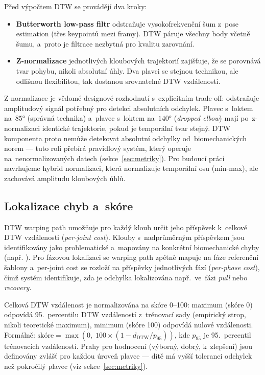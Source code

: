 Před výpočtem DTW se provádějí dva kroky:
\begin{itemize}
    \item \textbf{Butterworth low-pass filtr} odstraňuje vysokofrekvenční šum z~pose estimation (třes keypointů mezi framy). DTW páruje všechny body včetně šumu, a~proto je filtrace nezbytná pro kvalitu zarovnání.
    \item \textbf{Z-normalizace} jednotlivých kloubových trajektorií zajišťuje, že se porovnává tvar pohybu, nikoli absolutní úhly. Dva plavci se stejnou technikou, ale odlišnou flexibilitou, tak dostanou srovnatelné DTW vzdálenosti.
\end{itemize}

Z-normalizace je vědomé designové rozhodnutí s~explicitním trade-off: odstraňuje amplitudový signál potřebný pro detekci absolutních odchylek. Plavec s~loktem na~$85°$ (správná technika) a~plavec s~loktem na~$140°$ (\textit{dropped elbow}) mají po~z-normalizaci identické trajektorie, pokud je temporální tvar stejný. DTW komponenta proto nemůže detekovat absolutní odchylky od~biomechanických norem --- tuto roli přebírá pravidlový systém, který operuje na~nenormalizovaných datech (sekce~\ref{sec:metriky}). Pro budoucí práci navrhujeme hybrid normalizaci, která normalizuje temporální osu (min-max), ale zachovává amplitudu kloubových úhlů.

\subsection{Lokalizace chyb a~skóre}

DTW warping path umožňuje pro každý kloub určit jeho příspěvek k~celkové DTW vzdálenosti (\textit{per-joint cost}). Klouby s~nadprůměrným příspěvkem jsou identifikovány jako problematické a~mapovány na konkrétní biomechanické chyby (např. ). Pro fázovou lokalizaci se warping path zpětně mapuje na fáze referenční šablony a~per-joint cost se rozloží na příspěvky jednotlivých fází (\textit{per-phase cost}), čímž systém identifikuje, zda je odchylka lokalizována např.\ ve~fázi \textit{pull} nebo \textit{recovery}.

Celková DTW vzdálenost je normalizována na skóre 0--100: maximum (skóre 0) odpovídá 95.~percentilu DTW vzdáleností z~trénovací sady (empirický strop, nikoli teoretické maximum), minimum (skóre 100) odpovídá nulové vzdálenosti. Formálně: $\text{skóre} = \max(0,\; 100 \times (1 - d_{\text{DTW}} / p_{95}))$, kde $p_{95}$ je 95.~percentil trénovacích vzdáleností. Prahy pro hodnocení (výborný, dobrý, k~zlepšení) jsou definovány zvlášť pro každou úroveň plavce --- dítě má vyšší toleranci odchylek než pokročilý plavec (viz sekce~\ref{sec:metriky}).

